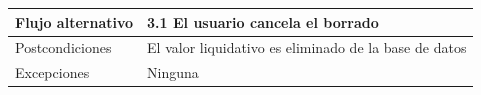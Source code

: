 \documentclass[12pt, a4paper]{book}
\begin{document}
\begin{table}[htbp]
\begin{tabular}{|l|l|}
		Flujo alternativo & 3.1 El usuario cancela el borrado                                                                                                                                                                                                                                                                                   \\ \hline
		Postcondiciones   & El valor liquidativo es eliminado de la base de datos                                                                                                                                                                                                                                                                  \\ \hline
		Excepciones       & Ninguna                                                                                                                                                                                                                                                                                                             \\ \hline
	\end{tabular}
\end{table}
\end{document}
